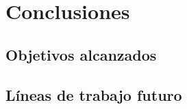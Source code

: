 \chapter{Conclusiones} \label{chap:conclusiones}


\section{Objetivos alcanzados} \label{sec:objetivos_alcanzados}


\section{Líneas de trabajo futuro} \label{sec:trabajo_futuro}
